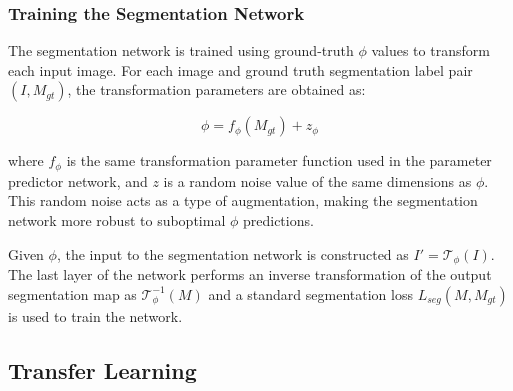 \subsubsection{Training the Segmentation Network}

The segmentation network is trained using ground-truth $\phi$ values to transform each input image. For each image and ground truth segmentation label pair $(I, M_{gt})$, the transformation parameters are obtained as:

\begin{equation}
	\phi = f_\phi(M_{gt}) + z_\phi
\end{equation}

where $f_\phi$ is the same transformation parameter function used in the parameter predictor network, and $z$ is a random noise value of the same dimensions as $\phi$. This random noise acts as a type of augmentation, making the segmentation network more robust to suboptimal $\phi$ predictions.

Given $\phi$, the input to the segmentation network is constructed as $I' = \mathcal{T}_\phi(I)$. The last layer of the network performs an inverse transformation of the output segmentation map as $\mathcal{T}^{-1}_\phi(M)$ and a standard segmentation loss $L_{seg}(M, M_{gt})$ is used to train the network.

\subsection{Transfer Learning}






